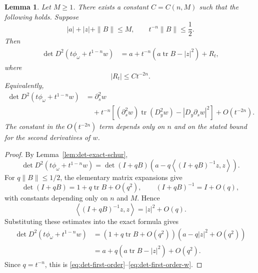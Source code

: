 \documentclass[11pt]{article}
\numberwithin{equation}{section}
\newtheorem{lemma}[theorem]{Lemma}
\newcommand{\tr}{\operatorname{tr}}
\begin{document}
\begin{lemma}\label{lem:det-first-order}
Let \(M\ge1\).  There exists a constant \(C=C(n,M)\) such that the following holds.  Suppose
\[
    |a|+|z|+\|B\|\le M,
    \qquad
    t^{-n}\|B\|\le \frac12.
\]
Then
\begin{equation}\label{eq:det-first-order}
\begin{aligned}
    \det D^2(t\phi_\omega+t^{1-n}w)
    &=
    a
    +
    t^{-n}\left(a\tr B-|z|^2\right)
    +
    R_t,
\end{aligned}
\end{equation}
where
\begin{equation}\label{eq:det-remainder-bound}
    |R_t|\le C t^{-2n}.
\end{equation}
Equivalently,
\begin{equation}\label{eq:det-first-order-w}
\begin{aligned}
    \det D^2(t\phi_\omega+t^{1-n}w)
    &=
    \partial_s^2 w \\
    &\quad
    +
    t^{-n}\left[
        (\partial_s^2w)\tr(D_y^2w)
        -
        |D_y\partial_s w|^2
    \right]
    +O(t^{-2n}).
\end{aligned}
\end{equation}
The constant in the \(O(t^{-2n})\) term depends only on \(n\) and on the stated bound for the second derivatives of \(w\).
\end{lemma}

\begin{proof}
By Lemma~\ref{lem:det-exact-schur},
\[
    \det D^2(t\phi_\omega+t^{1-n}w)
    =
    \det(I+qB)
    \left(a-q\left\langle (I+qB)^{-1}z,z\right\rangle\right).
\]
For \(q\|B\|\le1/2\), the elementary matrix expansions give
\[
    \det(I+qB)=1+q\tr B+O(q^2),
    \qquad
    (I+qB)^{-1}=I+O(q),
\]
with constants depending only on \(n\) and \(M\).  Hence
\[
    \left\langle (I+qB)^{-1}z,z\right\rangle
    =
    |z|^2+O(q).
\]
Substituting these estimates into the exact formula gives
\[
\begin{aligned}
    \det D^2(t\phi_\omega+t^{1-n}w)
    &=
    (1+q\tr B+O(q^2))
    (a-q|z|^2+O(q^2)) \\
    &=
    a+q(a\tr B-|z|^2)+O(q^2).
\end{aligned}
\]
Since \(q=t^{-n}\), this is \eqref{eq:det-first-order}--\eqref{eq:det-first-order-w}.
\end{proof}
\end{document}
